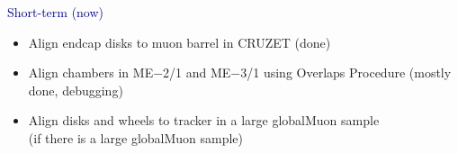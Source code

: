 \documentclass[compress]{beamer}
\begin{document}
\begin{frame}
\small
\vspace{0.5 cm}
\textcolor{darkblue}{\large Short-term (now)}
\begin{itemize}
\item Align endcap disks to muon barrel in CRUZET (done)
\item Align chambers in ME$-$2/1 and ME$-$3/1 using Overlaps Procedure (mostly done, debugging)
\item Align disks and wheels to tracker in a large globalMuon sample \\ (if there is a large globalMuon sample)
\end{itemize}

\vspace{0.4 cm}
\hspace{-0.83 cm} 

\vspace{0.1 cm}


\end{frame}
\end{document}
